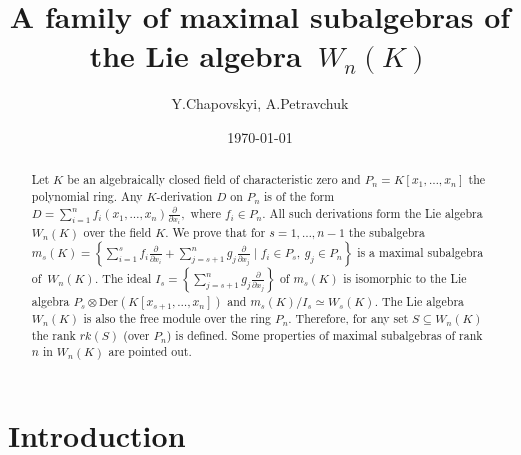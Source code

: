 \documentclass[12pt,a4paper]{amsart}
\theoremstyle{plain}
\theoremstyle{definition}
\begin{document}
\sloppy
%
\title[A family of maximal subalgebras of the Lie algebra~$W_n(K)$]
{A family of maximal subalgebras of the Lie algebra~$W_n(K)$}
\author
{Y.Chapovskyi, A.Petravchuk}
\address{Institute of Mathematics, National Academy of Sciences of Ukraine,
Tereschenkivska street, 3, 01004 Kyiv, Ukraine}
\address{ Faculty of Mechanics and Mathematics,
Taras Shevchenko National University of Kyiv, 64, Volodymyrska street, 01033  Kyiv, Ukraine}


\date{\today}


\begin{abstract}
Let $K$ be an algebraically closed field of characteristic zero and
${P_n=K[x_1,\ldots,x_n]}$ the polynomial ring.
Any $K$-derivation $D$ on $P_n$ is of the form
${
D=\sum_{i=1}^n f_i(x_1,\ldots,x_n)\frac{\partial}{\partial x_i}
},$
where $f_i\in P_n.$ All such derivations form the Lie algebra
$W_n(K)$ over the field $K$.
We prove that for $s=1,\ldots,n-1$ the subalgebra
$
m_s(K)=\left\{
\sum_{i=1}^s f_i\frac{\partial}{\partial x_i}
+\sum_{j=s+1}^n g_j\frac{\partial}{\partial x_j}
\mid f_i\in P_s,\ g_j\in P_n
\right\}
$
is a maximal subalgebra of~$W_n(K)$.
The ideal
$
I_s=\left\{\sum_{j=s+1}^n g_j\frac{\partial}{\partial x_j}\right\}
$
of $m_s(K)$ is isomorphic to the Lie algebra
$P_s\otimes \mathrm{Der}(K[x_{s+1},\ldots,x_n])$
and   $m_s(K)/I_s\simeq W_s(K)$. The Lie algebra $W_n(K)$ is also the free module over the ring $P_n.$ Therefore,  for  any set $S\subseteq W_n(K)$ the rank $rk(S)$ (over $P_n$) is defined. 
Some properties of maximal subalgebras of rank $n$ in $W_n(K)$
are pointed out.
\end{abstract}
\maketitle


\section{Introduction}
\end{document}
